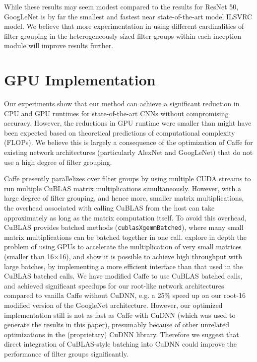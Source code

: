 \documentclass[thesis]{subfiles}
\begin{document}
	While these results may seem modest compared to the results for ResNet 50, GoogLeNet is by far the smallest and fastest near state-of-the-art model ILSVRC model. We believe that more experimentation in using different cardinalities of filter grouping in the heterogeneously-sized filter groups within each inception module will improve results further.
	
	\section{GPU Implementation}
	\label{gpuexplanation}
	Our experiments show that our method can achieve a significant reduction in CPU and GPU runtimes for state-of-the-art CNNs without compromising accuracy. However, the reductions in GPU runtime were smaller than might have been expected based on theoretical predictions of computational complexity (FLOPs). We believe this is largely a consequence of the optimization of Caffe for existing network architectures (particularly AlexNet and GoogLeNet) that do not use a high degree of filter grouping. %
	
	Caffe presently parallelizes over filter groups by using multiple CUDA streams to run multiple CuBLAS matrix multiplications simultaneously. However, with a large degree of filter grouping, and hence more, smaller matrix multiplications, the overhead associated with calling CuBLAS from the host can take approximately as long as the matrix computation itself. To avoid this overhead, CuBLAS provides batched methods (\eg \texttt{cublasXgemmBatched}), where many small matrix multiplications can be batched together in one call. \citet{Jhurani2015} explore in depth the problem of using GPUs to accelerate the multiplication of very small matrices (smaller than 16$\times$16), and show it is possible to achieve high throughput with large batches, by implementing a more efficient interface than that used in the CuBLAS batched calls.
	We have modified Caffe to use CuBLAS batched calls, and achieved significant speedups for our  root-like network architectures compared to vanilla Caffe without CuDNN, e.g. a 25\% speed up on our root-16 modified version of the GoogleNet architecture. However, our optimized implementation still is not as fast as Caffe with CuDNN (which was used to generate the results in this paper), presumably because of other unrelated optimizations in the (proprietary) CuDNN library. Therefore we suggest that direct integration of CuBLAS-style batching into CuDNN could improve the performance of filter groups significantly.
	
\end{document}
